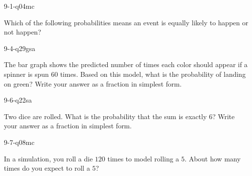 \begin{practiceQuestion}{9-1-q04}{mc}
\begin{questionText}
Which of the following probabilities means an event is equally likely to happen or not happen?
\end{questionText}
\end{practiceQuestion}

\begin{practiceQuestion}{9-4-q29}{gsa}
\begin{questionText}
The bar graph shows the predicted number of times each color should appear if a spinner is spun $60$ times. Based on this model, what is the probability of landing on green? Write your answer as a fraction in simplest form.

\begin{center}
\end{center}
\end{questionText}
\end{practiceQuestion}

\begin{practiceQuestion}{9-6-q22}{sa}
\begin{questionText}
Two dice are rolled. What is the probability that the sum is exactly $6$? Write your answer as a fraction in simplest form.
\end{questionText}
\end{practiceQuestion}

\begin{practiceQuestion}{9-7-q08}{mc}
\begin{questionText}
In a simulation, you roll a die $120$ times to model rolling a $5$. About how many times do you expect to roll a $5$?
\end{questionText}
\end{practiceQuestion}
